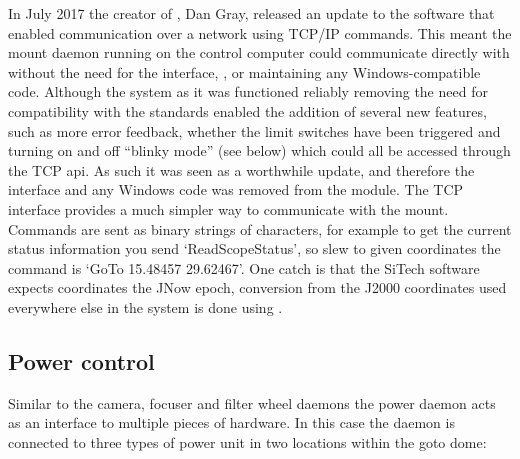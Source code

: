 \begin{colsection}
\begin{colsection}
In July 2017 the creator of , Dan Gray, released an update to the software that enabled communication over a network using TCP/IP commands. This meant the mount daemon running on the control computer could communicate directly with  without the need for the interface, ,  or maintaining any Windows-compatible code. Although the system as it was functioned reliably removing the need for compatibility with the  standards enabled the addition of several new features, such as more error feedback, whether the limit switches have been triggered and turning on and off ``blinky mode'' (see below) which could all be accessed through the TCP \gls{api}. As such it was seen as a worthwhile update, and therefore the  interface and any Windows code was removed from the  module. The TCP interface provides a much simpler way to communicate with the mount. Commands are sent as binary strings of characters, for example to get the current status information you send `ReadScopeStatus', so slew to given coordinates the command is `GoTo 15.48457 29.62467'. One catch is that the SiTech software expects coordinates the JNow epoch, conversion from the J2000 coordinates used everywhere else in the system is done using .

\end{colsection}


\subsection{Power control}
\label{sec:power}
\begin{colsection}

Similar to the camera, focuser and filter wheel daemons the power daemon acts as an interface to multiple pieces of hardware. In this case the daemon is connected to three types of power unit in two locations within the \gls{goto} dome:


\end{colsection}
\end{colsection}
